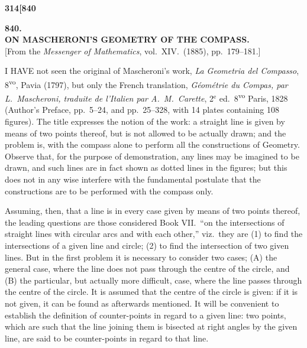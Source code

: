 \documentclass[12pt,a4paper]{article}
\theoremstyle{definition}
\begin{document}
\vspace{2em}


\newpage
\setcounter{page}{314}

\noindent\textbf{314}\hfill\textbf{[840}

\bigskip

\begin{center}
{\Large\textbf{840.}}\\[1em]
{\large\textbf{ON MASCHERONI'S GEOMETRY OF THE COMPASS.}}\\[1em]
[From the \textit{Messenger of Mathematics}, vol.\ XIV.\ (1885), pp.\ 179--181.]
\end{center}

\bigskip

\noindent I HAVE not seen the original of Mascheroni's work, \textit{La Geometria del Compasso}, 8\textsuperscript{vo}, Pavia (1797), but only the French translation, \textit{G\'eom\'etrie du Compas, par L.\ Mascheroni, traduite de l'Italien par A.~M.\ Carette}, 2$^\text{e}$ ed.\ 8\textsuperscript{vo} Paris, 1828 (Author's Preface, pp.\ 5--24, and pp.\ 25--328, with 14 plates containing 108 figures). The title expresses the notion of the work: a straight line is given by means of two points thereof, but is not allowed to be actually drawn; and the problem is, with the compass alone to perform all the constructions of Geometry. Observe that, for the purpose of demonstration, any lines may be imagined to be drawn, and such lines are in fact shown as dotted lines in the figures; but this does not in any wise interfere with the fundamental postulate that the constructions are to be performed with the compass only.

Assuming, then, that a line is in every case given by means of two points thereof, the leading questions are those considered Book VII.\ ``on the intersections of straight lines with circular arcs and with each other,'' viz.\ they are (1) to find the intersections of a given line and circle; (2) to find the intersection of two given lines. But in the first problem it is necessary to consider two cases; (A) the general case, where the line does not pass through the centre of the circle, and (B) the particular, but actually more difficult, case, where the line passes through the centre of the circle. It is assumed that the centre of the circle is given: if it is not given, it can be found as afterwards mentioned. It will be convenient to establish the definition of counter-points in regard to a given line: two points, which are such that the line joining them is bisected at right angles by the given line, are said to be counter-points in regard to that line.
\end{document}
